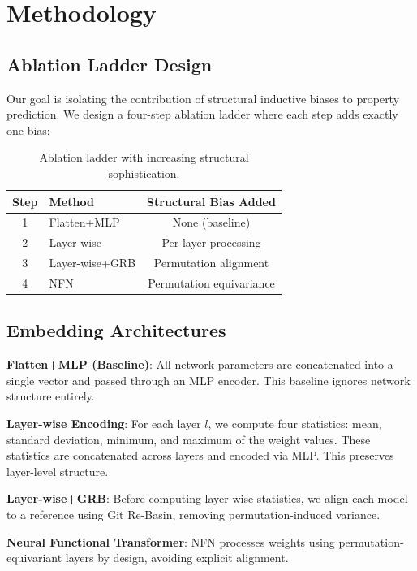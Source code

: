 \section{Methodology}

\subsection{Ablation Ladder Design}

Our goal is isolating the contribution of structural inductive biases to property prediction. We design a four-step ablation ladder where each step adds exactly one bias:

\begin{table}[h]
\centering
\begin{tabular}{@{}clc@{}}
\toprule
Step & Method & Structural Bias Added \\
\midrule
1 & Flatten+MLP & None (baseline) \\
2 & Layer-wise & Per-layer processing \\
3 & Layer-wise+GRB & Permutation alignment \\
4 & NFN & Permutation equivariance \\
\bottomrule
\end{tabular}
\caption{Ablation ladder with increasing structural sophistication.}
\label{tab:ablation-ladder}
\end{table}

\subsection{Embedding Architectures}

\textbf{Flatten+MLP (Baseline)}: All network parameters are concatenated into a single vector and passed through an MLP encoder. This baseline ignores network structure entirely.

\textbf{Layer-wise Encoding}: For each layer $l$, we compute four statistics: mean, standard deviation, minimum, and maximum of the weight values. These statistics are concatenated across layers and encoded via MLP. This preserves layer-level structure.

\textbf{Layer-wise+GRB}: Before computing layer-wise statistics, we align each model to a reference using Git Re-Basin, removing permutation-induced variance.

\textbf{Neural Functional Transformer}: NFN processes weights using permutation-equivariant layers by design, avoiding explicit alignment.

